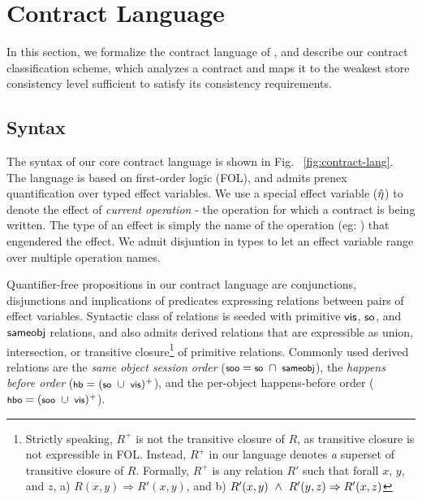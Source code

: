\section{Contract Language}
\label{sec:contract-lang}



In this section, we formalize the contract language of \name, and describe our
contract classification scheme, which analyzes a contract and maps it to the
weakest store consistency level sufficient to satisfy its consistency
requirements.


\subsection{Syntax}

The syntax of our core contract language is shown in Fig.
~\ref{fig:contract-lang}. The language is based on first-order logic (FOL), and
admits prenex quantification over typed effect variables. We use a special
effect variable ($\hat{\eta}$) to denote the effect of \emph{current operation} -
the operation for which a contract is being written. The type of an effect is
simply the name of the operation (eg: ) that engendered the
effect. We admit disjuntion in types to let an effect variable range over
multiple operation names.

Quantifier-free propositions in our contract language are conjunctions,
disjunctions and implications of predicates expressing relations between pairs
of effect variables. Syntactic class of relations is seeded with primitive
${\normalfont \textsf{vis}}$, ${\normalfont \textsf{so}}$, and ${\normalfont \textsf{sameobj}}$ relations, and also admits derived relations
that are expressible as union, intersection, or transitive
closure\footnote{Strictly speaking, $R^{+}$ is not the transitive closure of
$R$, as transitive closure is not expressible in FOL. Instead, $R^{+}$ in our
language denotes \emph{a} superset of transitive closure of $R$. Formally,
$R^{+}$ is any relation $R'$ such that forall $x$, $y$, and $z$, a) $R(x,y)
\Rightarrow R'(x,y)$, and b) $R'(x,y) ~\wedge~ R'(y,z) \Rightarrow R'(x,z)$} of
primitive relations. Commonly used derived relations are the \emph{same object
session order} ($\small \sooZ = \soZ ~\cap~ \sameobjZ$), the \emph{happens
before order} ($\small \hbZ = (\soZ ~\cup~ \visZ)^+$), and the per-object
happens-before order ($\small \hboZ = (\sooZ ~\cup~ \visZ)^+$).


